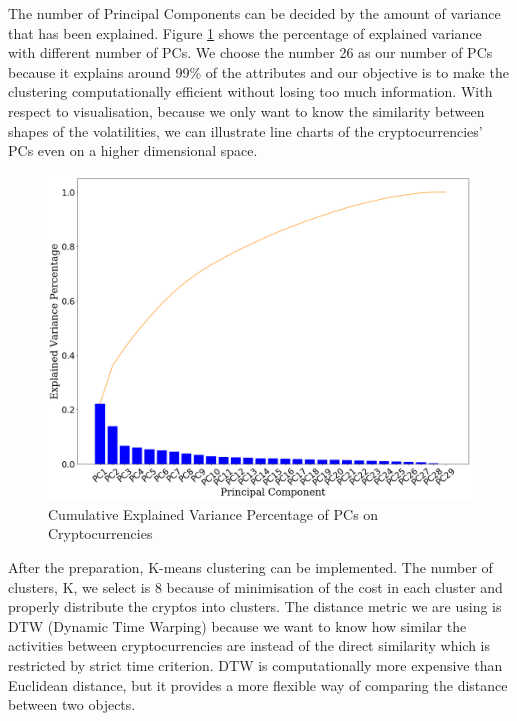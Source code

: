 \documentclass[11pt]{article} %
\theoremstyle{plain}
\theoremstyle{definition}
\begin{document}
The number of Principal Components can be decided by the amount of variance that has been explained. Figure \ref{fig:cryptopca} shows the percentage of explained variance with different number of PCs. We choose the number 26 as our number of PCs because it explains around 99\% of the attributes and our objective is to make the clustering computationally efficient without losing too much information. With respect to visualisation, because we only want to know the similarity between shapes of the volatilities, we can illustrate line charts of the cryptocurrencies' PCs even on a higher dimensional space.

\begin{figure}[ht]
    \includegraphics[width=1\linewidth, center]{resources/crypto_pca_explained.png}
    \caption{Cumulative Explained Variance Percentage of PCs on Cryptocurrencies}
    \label{fig:cryptopca}
\end{figure}

After the preparation, K-means clustering can be implemented. The number of clusters, K, we select is 8 because of minimisation of the cost in each cluster and properly distribute the cryptos into clusters. The distance metric we are using is DTW (Dynamic Time Warping) because we want to know how similar the activities between cryptocurrencies are instead of the direct similarity which is restricted by strict time criterion. DTW is computationally more expensive than Euclidean distance, but it provides a more flexible way of comparing the distance between two objects.
\end{document}
